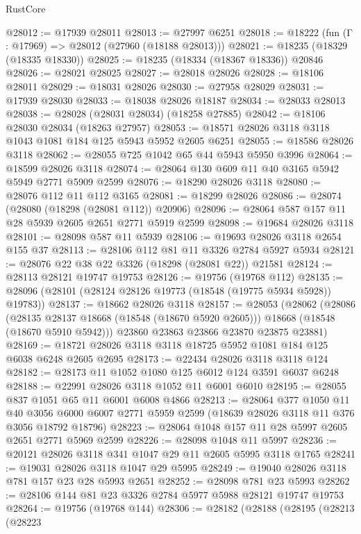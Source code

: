 \begin{lexlean}{RustCore}
\begin{coremodule}
@28012 := @17939 @28011
@28013 := @27997 @6251
@28018 := @18222 (fun (Γ : @17969) => @28012 (@27960 (@18188 @28013)))
@28021 := @18235 (@18329 (@18335 @18330))
@28025 := @18235 (@18334 (@18367 @18336)) @20846
@28026 := @28021 @28025
@28027 := @28018 @28026
@28028 := @18106 @28011
@28029 := @18031 @28026
@28030 := @27958 @28029
@28031 := @17939 @28030
@28033 := @18038 @28026 @18187
@28034 := @28033 @28013
@28038 := @28028 (@28031 @28034) (@18258 @27885)
@28042 := @18106 @28030 @28034 (@18263 @27957)
@28053 := @18571 @28026 @3118 @3118 @1043 @1081 @184 @125 @5943 @5952 @2605 @6251
@28055 := @18586 @28026 @3118
@28062 := @28055 @725 @1042 @65 @44 @5943 @5950 @3996
@28064 := @18599 @28026 @3118
@28074 := @28064 @130 @609 @11 @40 @3165 @5942 @5949 @2771 @5909 @2599
@28076 := @18290 @28026 @3118
@28080 := @28076 @112 @11 @112 @3165
@28081 := @18299 @28026
@28086 := @28074 (@28080 (@18298 (@28081 @112)) @20906)
@28096 := @28064 @587 @157 @11 @28 @5939 @2605 @2651 @2771 @5919 @2599
@28098 := @19684 @28026 @3118
@28101 := @28098 @587 @11 @5939
@28106 := @19693 @28026 @3118 @2654 @155 @37
@28113 := @28106 @112 @81 @11 @3326 @2784 @5927 @5934
@28121 := @28076 @22 @38 @22 @3326 (@18298 (@28081 @22)) @21581
@28124 := @28113 @28121 @19747 @19753
@28126 := @19756 (@19768 @112)
@28135 := @28096 (@28101 (@28124 @28126 @19773 (@18548 (@19775 @5934 @5928)) @19783))
@28137 := @18662 @28026 @3118
@28157 := @28053
    (@28062
      (@28086
        (@28135 @28137 @18668 (@18548 (@18670 @5920 @2605)))
        @18668
        (@18548 (@18670 @5910 @5942)))
      @23860
      @23863
      @23866
      @23870
      @23875
      @23881)
@28169 := @18721 @28026 @3118 @3118 @18725 @5952 @1081 @184 @125 @6038 @6248 @2605 @2695
@28173 := @22434 @28026 @3118 @3118 @124
@28182 := @28173 @11 @1052 @1080 @125 @6012 @124 @3591 @6037 @6248
@28188 := @22991 @28026 @3118 @1052 @11 @6001 @6010
@28195 := @28055 @837 @1051 @65 @11 @6001 @6008 @4866
@28213 := @28064
    @377
    @1050
    @11
    @40
    @3056
    @6000
    @6007
    @2771
    @5959
    @2599
    (@18639 @28026 @3118 @11 @376 @3056 @18792 @18796)
@28223 := @28064 @1048 @157 @11 @28 @5997 @2605 @2651 @2771 @5969 @2599
@28226 := @28098 @1048 @11 @5997
@28236 := @20121 @28026 @3118 @341 @1047 @29 @11 @2605 @5995 @3118 @1765
@28241 := @19031 @28026 @3118 @1047 @29 @5995
@28249 := @19040 @28026 @3118 @781 @157 @23 @28 @5993 @2651
@28252 := @28098 @781 @23 @5993
@28262 := @28106 @144 @81 @23 @3326 @2784 @5977 @5988 @28121 @19747 @19753
@28264 := @19756 (@19768 @144)
@28306 := @28182
    (@28188
      (@28195
        (@28213
          (@28223

\end{coremodule}
\end{lexlean}
